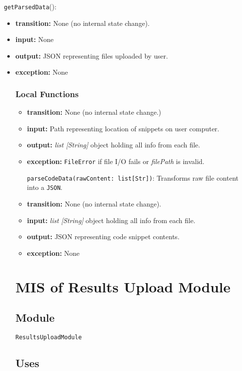 \documentclass[12pt, titlepage]{article}
\begin{document}
\noindent \texttt{getParsedData}():
\begin{itemize}
    \item \textbf{transition:} None (no internal state change).
    \item \textbf{input:} None
    \item \textbf{output:} JSON representing files uploaded by user.
    \item \textbf{exception:} None

\subsubsection{Local Functions}

\begin{itemize}
\noindent \texttt{readLocalFile(path: Str)}: 
    \item \textbf{transition:} None (no internal state change.)
    \item \textbf{input:} Path representing location of snippets on user computer.
    \item \textbf{output:} \textit{list [String]} object holding all info from each
    file.
    \item \textbf{exception:} \texttt{FileError} if file I/O fails or \textit{filePath} is invalid.

\noindent \texttt{parseCodeData(rawContent: list[Str])}: Transforms raw file content into a \texttt{JSON}.
    \item \textbf{transition:} None (no internal state change).
    \item \textbf{input:}  \textit{list [String]} object holding all info from each
    file.
    \item \textbf{output:} JSON representing code snippet contents.
    \item \textbf{exception:} None
\end{itemize}

\section{MIS of Results Upload Module} \label{mResultsUpload}

\subsection{Module} %

\texttt{ResultsUploadModule}

\subsection{Uses}


\end{itemize}
\end{document}

